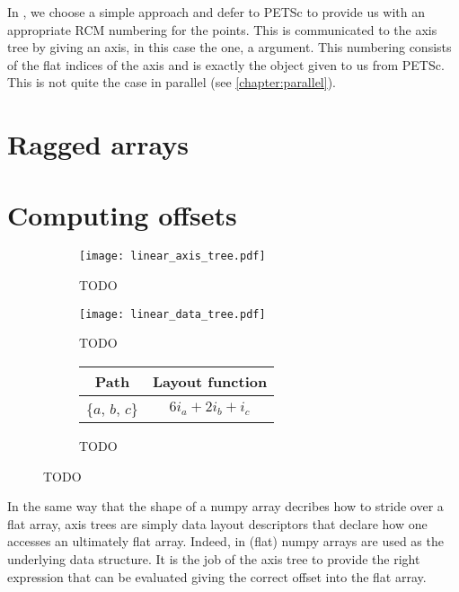 \documentclass[thesis]{subfiles}
\begin{document}
In , we choose a simple approach and defer to PETSc to provide us with an appropriate RCM numbering for the points.
This is communicated to the axis tree by giving an axis, in this case the  one, a  argument.
This numbering consists of the flat indices of the axis and is exactly the object given to us from PETSc.
This is not quite the case in parallel (see \cref{chapter:parallel}).

\section{Ragged arrays}

\section{Computing offsets}

\begin{figure}
  \centering
  \begin{subfigure}{.3\textwidth}
    \centering
    \texttt{[image: linear\_axis\_tree.pdf]}
    \caption{TODO}
    \label{fig:linear_axis_tree}
  \end{subfigure}
  \begin{subfigure}{.58\textwidth}
    \centering
    \texttt{[image: linear\_data\_tree.pdf]}
    \caption{TODO}
    \label{fig:linear_data_tree}
  \end{subfigure}

  \vspace{1em}

  \begin{subfigure}{\textwidth}
    \centering
    \begin{tabular}{c|c}
      \textbf{Path} & \textbf{Layout function} \\
      \hline
      \{$a$, $b$, $c$\} & $6 i_a + 2 i_b + i_c$ \\
    \end{tabular}
    \caption{TODO}
    \label{fig:multi_component_layouts}
  \end{subfigure}
  \caption{TODO}
  \label{fig:linear_axis_data_tree}
\end{figure}

In the same way that the shape of a numpy array decribes how to stride over a flat array, axis trees are simply data layout descriptors that declare how one accesses an ultimately flat array.
Indeed, in  (flat) numpy arrays are used as the underlying data structure.
It is the job of the axis tree to provide the right expression that can be evaluated giving the correct offset into the flat array.
\end{document}
